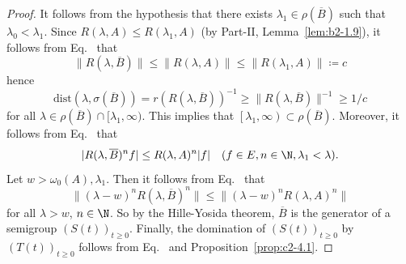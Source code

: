 \begin{proof}
It follows from the hypothesis that there exists $\lambda_{1} \in \rho(\overline{B})$ such that $\lambda_{0} < \lambda_{1}$. 
Since $R(\lambda,A) \leq R(\lambda_{1},A)$ (by Part-II, Lemma~\ref{lem:b2-1.9}), it follows from Eq.~ that 
%
\[
	\|R(\lambda,\overline{B})\| \leq \|R(\lambda,A)\| \leq \|R(\lambda_{1},A)\| \coloneq c  
\]
%
hence 
%
\[
	\text{dist}(\lambda,\sigma(\overline{B})) = r(R(\lambda,\overline{B}))^{-1} \geq \|R(\lambda,\overline{B})\|^{-1} \geq 1/c 
\]
%
for all $\lambda \in \rho(\overline{B}) \cap [\lambda_{1},\infty)$. 
This implies that $\left[\lambda_{1},\infty\right) \subset \rho(\overline{B})$. Moreover, it follows from Eq.~ that
\begin{equation}\label{eq:c2-4.9}
|R(\lambda,\overline{B})^{n}f| \leq R(\lambda,A)^{n}|f| \quad (f \in E, n \in \N , \lambda_{1} < \lambda).
\end{equation}
Let $w > \omega_{0}(A), \lambda_{1}$. 
Then it follows from Eq.~ that 
%
\[
	\|(\lambda - w)^{n}R(\lambda,\overline{B})^{n}\| \leq \|(\lambda - w)^{n}R(\lambda,A)^{n}\| 
\]
%
for all $\lambda > w$, $n \in \N $. 
So by the Hille-Yosida theorem, $\overline{B}$ is the generator of a semigroup $(S(t))_{t \geq 0}$. 
Finally, the domination of\/ $(S(t))_{t \geq 0}$ by $(T(t))_{t \geq 0}$ follows from Eq.~ and  Proposition~\ref{prop:c2-4.1}.
\end{proof}
